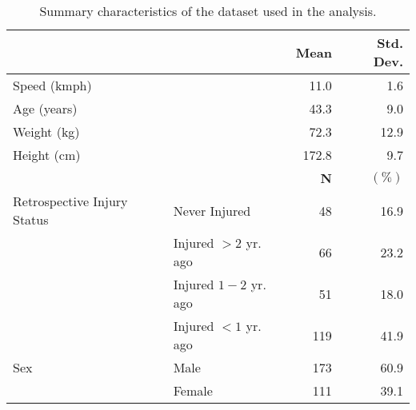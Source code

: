 \begin{table}
\centering
\begin{tabular}[t]{llrr}
\toprule
  &    & \textbf{Mean} & \textbf{Std. Dev.}\\
\midrule
Speed (kmph) &  & 11.0 & 1.6\\
Age (years) &  & 43.3 & 9.0\\
Weight (kg) &  & 72.3 & 12.9\\
Height (cm) &  & 172.8 & 9.7\\
\midrule
 &  & \textbf{N} & $\mathbf{(\%)}$\\
\midrule
Retrospective Injury Status & Never Injured & 48 & 16.9\\
 & Injured $>2$ yr. ago & 66 & 23.2\\
 & Injured $1-2$ yr. ago & 51 & 18.0\\
 & Injured $<1$ yr. ago & 119 & 41.9\\
Sex & Male & 173 & 60.9\\
 & Female & 111 & 39.1\\
\bottomrule
\end{tabular}
\caption{Summary characteristics of the dataset used in the analysis.}
\label{tab:tab1.}
\end{table}
